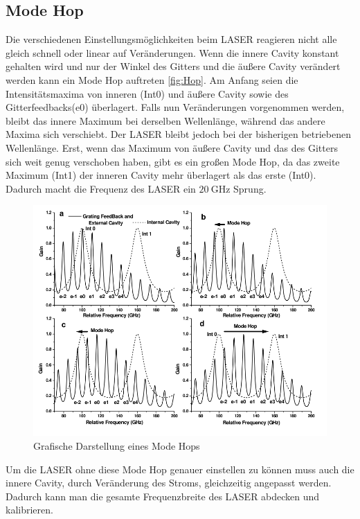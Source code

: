 \subsection{Mode Hop}
Die verschiedenen Einstellungsmöglichkeiten beim LASER reagieren nicht alle gleich schnell oder linear auf Veränderungen.
Wenn die innere Cavity konstant gehalten wird und nur der Winkel des Gitters und die äußere Cavity verändert werden kann ein Mode Hop auftreten \eqref{fig:Hop}.
Am Anfang seien die Intensitätsmaxima von inneren (Int0) und äußere Cavity sowie des Gitterfeedbacks(e0) überlagert. Falls nun Veränderungen vorgenommen werden, 
bleibt das innere Maximum bei derselben Wellenlänge, während das andere Maxima sich verschiebt. 
Der LASER bleibt jedoch bei der bisherigen betriebenen Wellenlänge. 
Erst, wenn das Maximum von äußere Cavity und das des Gitters sich weit genug verschoben haben, gibt es ein großen Mode Hop, 
da das zweite Maximum (Int1) der inneren Cavity mehr überlagert als das erste (Int0).
Dadurch macht die Frequenz des LASER ein $\qty{20}{\giga\hertz}$ Sprung. 

\begin{figure}[H]
    \centering
    \includegraphics[width=\textwidth]{Bilder/Mode_Hop.png} 
    \caption{Grafische Darstellung eines Mode Hops \cite{man:v60}}
    \label{fig:Hop}
\end{figure}

Um die LASER ohne diese Mode Hop genauer einstellen zu können muss auch die innere Cavity, durch Veränderung des Stroms, gleichzeitig angepasst werden.
Dadurch kann man die gesamte Frequenzbreite des LASER abdecken und kalibrieren. 


